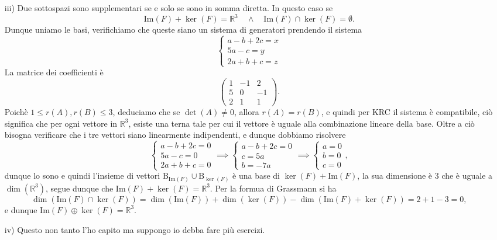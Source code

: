 \documentclass{article}
\theoremstyle{plain}
\theoremstyle{definition}
\theoremstyle{remark}
\begin{document}
\begin{enumerate}
\begin{enumerate}
        \item[iii)] 
        Due sottospazi sono supplementari se e solo se sono in somma diretta. In questo caso se 
        \[\mathrm{Im}(F) + \ker(F)=\mathbb{R}^3 \quad\land\quad \mathrm{Im}(F) \cap \ker(F)=\emptyset.\]
        Dunque uniamo le basi, verifichiamo che queste siano un sistema di generatori prendendo il sistema 
        \[ \begin{cases}a-b+2c=x\\5a-c=y\\2a+b+c=z\end{cases} \]
        La matrice dei coefficienti è 
        \[\begin{pmatrix}
        1&-1&2\\
        5&0&-1\\
        2&1&1
        \end{pmatrix}.\]
        Poichè $1\leq r(A),r(B)\leq 3$, deduciamo che se $\det(A)\neq0$, allora $r(A)=r(B)$, e quindi per KRC il sistema è compatibile, ciò significa che per ogni vettore in $\mathbb{R}^3$, esiste una terna tale per cui il vettore è uguale alla combinazione lineare della base. 
        Oltre a ciò bisogna verificare che i tre vettori siano linearmente indipendenti, e dunque dobbiamo risolvere 
        \[ \begin{cases}a-b+2c=0\\5a-c=0\\2a+b+c=0\end{cases}\implies\begin{cases}a-b+2c=0\\c=5a\\b=-7a\end{cases}\implies \begin{cases}a=0\\b=0\\c=0\end{cases},\]
        dunque lo sono e quindi l'insieme di vettori $\mathrm{B}_{\mathrm{Im}(F)}\cup\mathrm{B}_{\ker(F)}$ è una base di $\ker(F)+\mathrm{Im}(F)$, la sua dimensione è $3$ che è uguale a $\dim(\mathbb{R}^3)$, segue dunque che 
        $\mathrm{Im}(F)+\ker(F)=\mathbb{R}^3$. Per la formua di Grassmann si ha 
        \[\dim(\mathrm{Im}(F)\cap\ker(F))=\dim(\mathrm{Im}(F))+\dim(\ker(F))-\dim(\mathrm{Im}(F)+\ker(F))=2+1-3=0,\]
        e dunque $\mathrm{Im}(F) \oplus \ker(F) = \mathbb{R}^3$.

        \item[iv)] Questo non tanto l'ho capito ma suppongo io debba fare più esercizi.
        
        
    \end{enumerate}
\end{enumerate}
\end{document}
